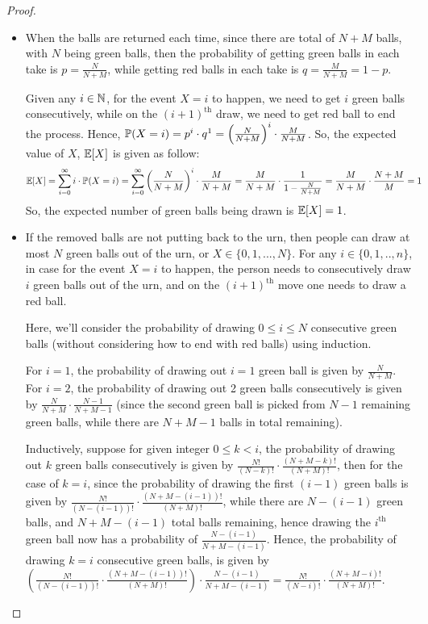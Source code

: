 \documentclass{article}
\begin{document}
\begin{proof}

    \hfil

    \begin{itemize}
        \item[a)] When the balls are returned each time, since there are total of $N+M$ balls, with $N$ being green balls, then the probability of getting green balls in each take is $p=\frac{N}{N+M}$, while getting red balls in each take is $q=\frac{M}{N+M}=1-p$.
        
        Given any $i\in\mathbb{N}$, for the event $X=i$ to happen, we need to get $i$ green balls consecutively, while on the $(i+1)^\text{th}$ draw, we need to get red ball to end the process. Hence, $\mathbb{P}(X=i) = p^i \cdot q^1 = \left(\frac{N}{N+M}\right)^i \cdot \frac{M}{N+M}$. So, the expected value of $X$, $\mathbb{E}[X]$ is given as follow:
        \begin{align}
            \mathbb{E}[X] &= \sum_{i=0}^{\infty}i\cdot \mathbb{P}(X=i) = \sum_{i=0}^{\infty}\left(\frac{N}{N+M}\right)^i\cdot\frac{M}{N+M} = \frac{M}{N+M}\cdot\frac{1}{1-\frac{N}{N+M}} = \frac{M}{N+M}\cdot \frac{N+M}{M}=1
        \end{align}
        So, the expected number of green balls being drawn is $\mathbb{E}[X]=1$.

        \hfil

        \item[b)] If the removed balls are not putting back to the urn, then people can draw at most $N$ green balls out of the urn, or $X\in\{0,1,...,N\}$. For any $i\in\{0,1,..,n\}$, in case for the event $X=i$ to happen, the person needs to consecutively draw $i$ green balls out of the urn, and on the $(i+1)^\text{th}$ move one needs to draw a red ball. 
        
        \vspace{0.7em}

        Here, we'll consider the probability of drawing $0\leq i\leq N$ consecutive green balls (without considering how to end with red balls) using induction.
        
        For $i=1$, the probability of drawing out $i=1$ green ball is given by $\frac{N}{N+M}$. For $i=2$, the probability of drawing out 2 green balls consecutively is given by $\frac{N}{N+M}\cdot \frac{N-1}{N+M-1}$ (since the second green ball is picked from $N-1$ remaining green balls, while there are $N+M-1$ balls in total remaining). 
        
        Inductively, suppose for given integer $0\leq k<i$, the probability of drawing out $k$ green balls consecutively is given by $\frac{N!}{(N-k)!}\cdot \frac{(N+M-k)!}{(N+M)!}$, then for the case of $k=i$, since the probability of drawing the first $(i-1)$ green balls is given by $\frac{N!}{(N-(i-1))!}\cdot \frac{(N+M-(i-1))!}{(N+M)!}$, while there are $N-(i-1)$ green balls, and $N+M-(i-1)$ total balls remaining, hence drawing the $i^\text{th}$ green ball now has a probability of $\frac{N-(i-1)}{N+M-(i-1)}$. Hence, the probability of drawing $k=i$ consecutive green balls, is given by $\left(\frac{N!}{(N-(i-1))!}\cdot \frac{(N+M-(i-1))!}{(N+M)!}\right)\cdot \frac{N-(i-1)}{N+M-(i-1)} = \frac{N!}{(N-i)!}\cdot \frac{(N+M-i)!}{(N+M)!}$.


\end{itemize}
\end{proof}
\end{document}
